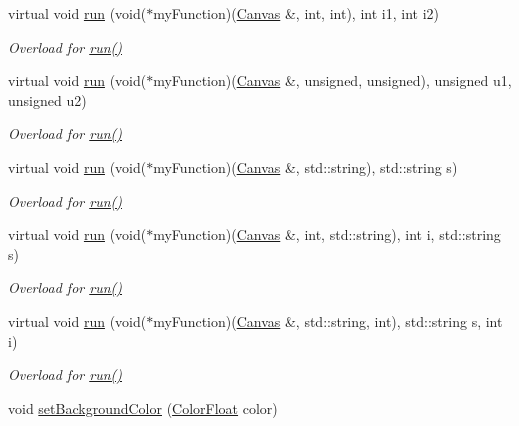\begin{DoxyCompactItemize}
virtual void \hyperlink{classtsgl_1_1_canvas_a768c10737f9590a25d8e66dcc7137d9b}{run} (void($\ast$my\-Function)(\hyperlink{classtsgl_1_1_canvas}{\-Canvas} \&, int, int), int i1, int i2)
\begin{DoxyCompactList}\small\item\em \-Overload for \hyperlink{classtsgl_1_1_canvas_a5f3f00d6c380a662a239077456045502}{run()} \end{DoxyCompactList}\item 
virtual void \hyperlink{classtsgl_1_1_canvas_ab146e6cf9f7f19a047c20c02a0eb30f9}{run} (void($\ast$my\-Function)(\hyperlink{classtsgl_1_1_canvas}{\-Canvas} \&, unsigned, unsigned), unsigned u1, unsigned u2)
\begin{DoxyCompactList}\small\item\em \-Overload for \hyperlink{classtsgl_1_1_canvas_a5f3f00d6c380a662a239077456045502}{run()} \end{DoxyCompactList}\item 
virtual void \hyperlink{classtsgl_1_1_canvas_a2eeece8d4c4453ec7b4b53e209004559}{run} (void($\ast$my\-Function)(\hyperlink{classtsgl_1_1_canvas}{\-Canvas} \&, std\-::string), std\-::string s)
\begin{DoxyCompactList}\small\item\em \-Overload for \hyperlink{classtsgl_1_1_canvas_a5f3f00d6c380a662a239077456045502}{run()} \end{DoxyCompactList}\item 
virtual void \hyperlink{classtsgl_1_1_canvas_ac507bbbf60328de2fc99f93cd37d04ec}{run} (void($\ast$my\-Function)(\hyperlink{classtsgl_1_1_canvas}{\-Canvas} \&, int, std\-::string), int i, std\-::string s)
\begin{DoxyCompactList}\small\item\em \-Overload for \hyperlink{classtsgl_1_1_canvas_a5f3f00d6c380a662a239077456045502}{run()} \end{DoxyCompactList}\item 
virtual void \hyperlink{classtsgl_1_1_canvas_aafed71cba89b059629647e77ba23ff2b}{run} (void($\ast$my\-Function)(\hyperlink{classtsgl_1_1_canvas}{\-Canvas} \&, std\-::string, int), std\-::string s, int i)
\begin{DoxyCompactList}\small\item\em \-Overload for \hyperlink{classtsgl_1_1_canvas_a5f3f00d6c380a662a239077456045502}{run()} \end{DoxyCompactList}\item 
void \hyperlink{classtsgl_1_1_canvas_abb668fe42e2fe7f269b255152df959d8}{set\-Background\-Color} (\hyperlink{structtsgl_1_1_color_float}{\-Color\-Float} color)

\end{DoxyCompactItemize}
